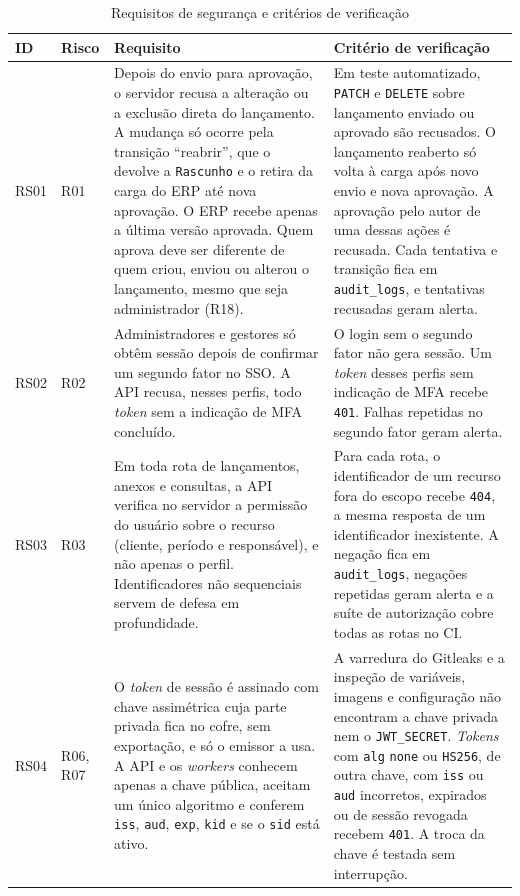 \documentclass[conference]{IEEEtran}
\begin{document}
\begin{table}[!t]
\centering
\caption{Requisitos de segurança e critérios de verificação}
\label{tab:requisitos}
\footnotesize
\renewcommand{\arraystretch}{1.15}
\begin{tabularx}{\textwidth}{@{}l l Y Y@{}}
\hline
\textbf{ID} & \textbf{Risco} & \textbf{Requisito} & \textbf{Critério de verificação} \\
\hline
RS01 & R01 &
Depois do envio para aprovação, o servidor recusa a alteração ou a exclusão direta do lançamento. A mudança só ocorre pela transição ``reabrir'', que o devolve a \texttt{Rascunho} e o retira da carga do ERP até nova aprovação. O ERP recebe apenas a última versão aprovada. Quem aprova deve ser diferente de quem criou, enviou ou alterou o lançamento, mesmo que seja administrador (R18). &
Em teste automatizado, \texttt{PATCH} e \texttt{DELETE} sobre lançamento enviado ou aprovado são recusados. O lançamento reaberto só volta à carga após novo envio e nova aprovação. A aprovação pelo autor de uma dessas ações é recusada. Cada tentativa e transição fica em \texttt{audit\_logs}, e tentativas recusadas geram alerta. \\
RS02 & R02 &
Administradores e gestores só obtêm sessão depois de confirmar um segundo fator no SSO. A API recusa, nesses perfis, todo \textit{token} sem a indicação de MFA concluído. &
O login sem o segundo fator não gera sessão. Um \textit{token} desses perfis sem indicação de MFA recebe \texttt{401}. Falhas repetidas no segundo fator geram alerta. \\
RS03 & R03 &
Em toda rota de lançamentos, anexos e consultas, a API verifica no servidor a permissão do usuário sobre o recurso (cliente, período e responsável), e não apenas o perfil. Identificadores não sequenciais servem de defesa em profundidade. &
Para cada rota, o identificador de um recurso fora do escopo recebe \texttt{404}, a mesma resposta de um identificador inexistente. A negação fica em \texttt{audit\_logs}, negações repetidas geram alerta e a suíte de autorização cobre todas as rotas no CI. \\
RS04 & R06, R07 &
O \textit{token} de sessão é assinado com chave assimétrica cuja parte privada fica no cofre, sem exportação, e só o emissor a usa. A API e os \textit{workers} conhecem apenas a chave pública, aceitam um único algoritmo e conferem \texttt{iss}, \texttt{aud}, \texttt{exp}, \texttt{kid} e se o \texttt{sid} está ativo. &
A varredura do Gitleaks e a inspeção de variáveis, imagens e configuração não encontram a chave privada nem o \texttt{JWT\_SECRET}. \textit{Tokens} com \texttt{alg} \texttt{none} ou \texttt{HS256}, de outra chave, com \texttt{iss} ou \texttt{aud} incorretos, expirados ou de sessão revogada recebem \texttt{401}. A troca da chave é testada sem interrupção. \\

\end{tabularx}
\end{table}
\end{document}
